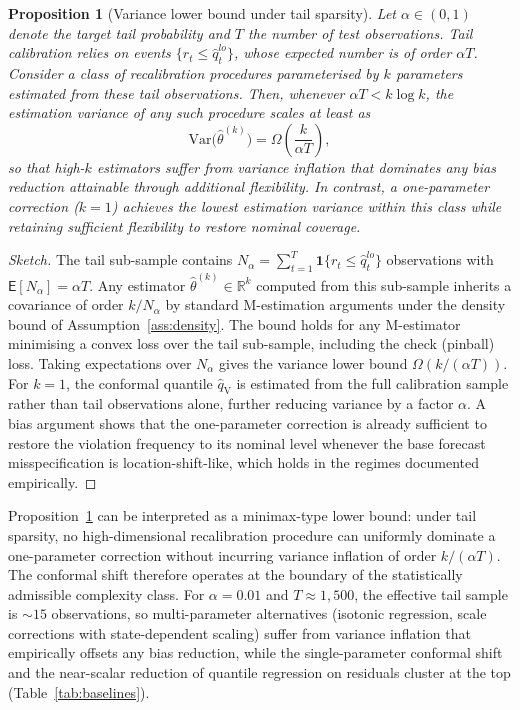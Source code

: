 \documentclass[preprint,11pt,authoryear]{elsarticle}
\newtheorem{proposition}[theorem]{Proposition}
\newcommand{\E}{\mathsf{E}}
\newcommand{\1}{\boldsymbol{1}}
\newcommand{\qV}{\hat{q}_{\scriptscriptstyle\mathrm{V}}}
\begin{document}
	\begin{proposition}[Variance lower bound under tail sparsity]
		\label{prop:tail_sparsity}
		Let $\alpha \in (0,1)$ denote the target tail probability and $T$ the number of test observations. Tail calibration relies on events $\{r_t \leq \hat{q}_t^{lo}\}$, whose expected number is of order $\alpha T$. Consider a class of recalibration procedures parameterised by $k$ parameters estimated from these tail observations. Then, whenever $\alpha T < k \log k$, the estimation variance of any such procedure scales at least as
		\[
		\mathrm{Var}\bigl(\hat\theta^{(k)}\bigr) = \Omega\!\left(\frac{k}{\alpha T}\right),
		\]
		so that high-$k$ estimators suffer from variance inflation that dominates any bias reduction attainable through additional flexibility. In contrast, a one-parameter correction ($k = 1$) achieves the lowest estimation variance within this class while retaining sufficient flexibility to restore nominal coverage.
	\end{proposition}

	\begin{proof}[Sketch]
		The tail sub-sample contains $N_\alpha = \sum_{t=1}^T \mathbf{1}\{r_t \leq \hat q_t^{lo}\}$ observations with $\E[N_\alpha] = \alpha T$. Any estimator $\hat\theta^{(k)} \in \mathbb{R}^k$ computed from this sub-sample inherits a covariance of order $k/N_\alpha$ by standard M-estimation arguments under the density bound of Assumption~\ref{ass:density}. The bound holds for any M-estimator minimising a convex loss over the tail sub-sample, including the check (pinball) loss. Taking expectations over $N_\alpha$ gives the variance lower bound $\Omega(k/(\alpha T))$. For $k = 1$, the conformal quantile $\qV$ is estimated from the full calibration sample rather than tail observations alone, further reducing variance by a factor $\alpha$. A bias argument shows that the one-parameter correction is already sufficient to restore the violation frequency to its nominal level whenever the base forecast misspecification is location-shift-like, which holds in the regimes documented empirically.
	\end{proof}

	\noindent
	Proposition~\ref{prop:tail_sparsity} can be interpreted as a minimax-type lower bound: under tail sparsity, no high-dimensional recalibration procedure can uniformly dominate a one-parameter correction without incurring variance inflation of order $k/(\alpha T)$. The conformal shift therefore operates at the boundary of the statistically admissible complexity class. For $\alpha = 0.01$ and $T \approx 1{,}500$, the effective tail sample is ${\sim}15$ observations, so multi-parameter alternatives (isotonic regression, scale corrections with state-dependent scaling) suffer from variance inflation that empirically offsets any bias reduction, while the single-parameter conformal shift and the near-scalar reduction of quantile regression on residuals cluster at the top (Table~\ref{tab:baselines}).
\end{document}
